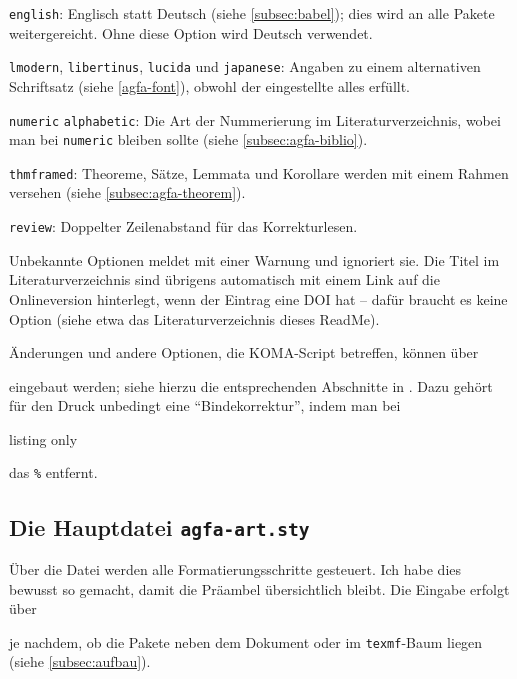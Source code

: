 \begin{myitemize}

\item
\texttt{english}: Englisch statt Deutsch (siehe \vref{subsec:babel}); dies wird an alle Pakete weitergereicht.
Ohne diese Option wird Deutsch verwendet.

\item
\texttt{lmodern}, \texttt{libertinus}, \texttt{lucida} und \texttt{japanese}: Angaben zu einem alternativen Schriftsatz (siehe \vref{agfa-font}), obwohl der eingestellte alles erfüllt.

\item
\texttt{numeric} \bzw \texttt{alphabetic}: Die Art der Nummerierung im Literaturverzeichnis, wobei man bei \texttt{numeric} bleiben sollte (siehe \vref{subsec:agfa-biblio}).

\item
\texttt{thmframed}: Theoreme, Sätze, Lemmata und Korollare werden mit einem Rahmen versehen (siehe \vref{subsec:agfa-theorem}).

\item
\texttt{review}: Doppelter Zeilenabstand für das Korrekturlesen.
\end{myitemize}
%
Unbekannte Optionen meldet  mit einer Warnung und ignoriert sie.
Die Titel im Literaturverzeichnis sind übrigens automatisch mit einem Link auf die Onlineversion hinterlegt, wenn der Eintrag eine DOI hat -- dafür braucht es keine Option (siehe etwa das Literaturverzeichnis dieses ReadMe).

Änderungen und andere Optionen, die KOMA-Script betreffen, können über 
%
\begin{center}
\end{center}
%
eingebaut werden; siehe hierzu die entsprechenden Abschnitte in \textcite{kohm:2020}.
Dazu gehört für den Druck unbedingt eine \enquote{Bindekorrektur}, indem man bei 
%
\begin{tcblisting}{listing only}
\end{tcblisting}
%
das \texttt{\%} entfernt.

\subsection{Die Hauptdatei \texttt{agfa-art.sty}}\label{subsec:agfa-art}
%
Über die Datei  werden alle Formatierungsschritte gesteuert.
Ich habe dies bewusst so gemacht, damit die Präambel übersichtlich bleibt. 
Die Eingabe erfolgt über
%
\begin{tcolorbox}
 \quad \bzw \quad {}
\end{tcolorbox}
%
je nachdem, ob die Pakete neben dem Dokument oder im \texttt{texmf}-Baum liegen (siehe \vref{subsec:aufbau}).

